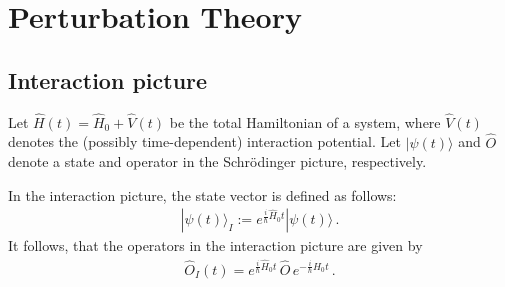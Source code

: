 \chapter{Perturbation Theory}

\section{Interaction picture}\label{section:interaction_picture}

    Let $\widehat{H}(t)=\widehat{H}_0+\widehat{V}(t)$ be the total Hamiltonian of a system, where $\widehat{V}(t)$ denotes the (possibly time-dependent) interaction potential. Let $|\psi(t)\rangle$ and $\widehat{O}$ denote a state and operator in the Schr\"odinger picture, respectively.

    \begin{definition}
        In the interaction picture, the state vector is defined as follows:
        \begin{gather}
            |\psi(t)\rangle_I := e^{\tfrac{i}{\hbar}\widehat{H}_0t}|\psi(t)\rangle\,.
        \end{gather}
        It follows, that the operators in the interaction picture are given by
        \begin{gather}
            \widehat{O}_I(t) = e^{\tfrac{i}{\hbar}\widehat{H}_0t}\,\widehat{O}\,e^{-\tfrac{i}{\hbar}\widehat{H}_0t}\,.
        \end{gather}
    \end{definition}

